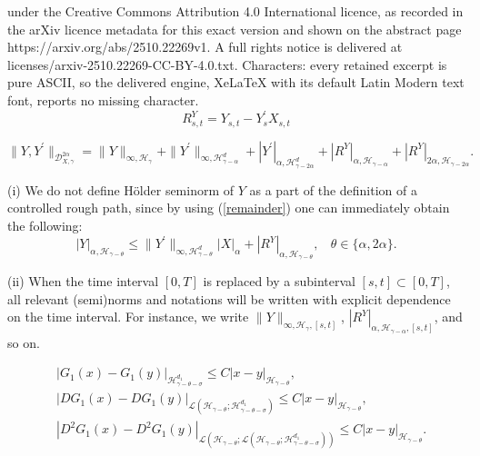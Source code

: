 \documentclass[10pt,a4paper]{amsart}
\begin{document}
under the Creative Commons Attribution 4.0 International licence, as recorded in the arXiv licence metadata for this exact version and shown on the abstract page https://arxiv.org/abs/2510.22269v1. A full rights notice is delivered at licenses/arxiv-2510.22269-CC-BY-4.0.txt. Characters: every retained excerpt is pure ASCII, so the delivered engine, XeLaTeX with its default Latin Modern text font, reports no missing character.
	\begin{equation}\label{remainder}
		R_{s,t}^Y = Y_{s,t}-Y_s^{\prime}  X_{s,t}
	\end{equation}

\begin{equation}\label{norm}
	\|Y,Y^{\prime}\|_{ \mathcal{D}_{X,\gamma}^{2\alpha} }=
	\|Y\|_{\infty, \mathcal H_\gamma}
	+ \|Y^{\prime}\|_{\infty, \mathcal H_{\gamma-\alpha}^d}
	+|Y^{\prime}|_{\alpha, \mathcal H_{\gamma-2\alpha}^d}
	+|R^Y|_{\alpha, \mathcal H_{\gamma-\alpha}}
	+|R^Y|_{2\alpha,\mathcal H_{\gamma-2\alpha}} .
\end{equation}

\begin{remark}
(i) We do not define H\"{o}lder seminorm of $Y$ as a part of the definition of a controlled rough path,
since by using (\ref{remainder}) one can immediately obtain the following:
\begin{equation}\label{Y}
|Y|_{ \alpha , \mathcal H_{\gamma-\theta} } \leq \| Y^{\prime} \|_{\infty, \mathcal H_{\gamma-\theta}^d } |X|_{\alpha} + |R^Y|_{\alpha, \mathcal H_{\gamma-\theta} }, ~~~~ \theta \in \{\alpha,2\alpha\}.
\end{equation}

(ii) When the time interval $[0, T]$ is replaced by a subinterval $[s, t]\subset [0,T]$, all relevant (semi)norms and notations will be written with explicit dependence on the time interval. For instance, we write $\|Y\|_{\infty, \mathcal H_\gamma,[s,t]}$, $|R^Y|_{\alpha,\mathcal H_{\gamma-\alpha},[s,t]}$, and so on.
\end{remark}	

\begin{align}
	&|G_1(x)-G_1(y)|_{\mathcal{H}_{\gamma-\theta-\sigma}^{d_1}} \leq C |x-y|_{\mathcal H_{\gamma-\theta}}, \label{G1} \\
	&  |DG_1(x)-DG_1(y)|_{\mathcal L(\mathcal H_{\gamma-\theta}; \mathcal{H}_{\gamma-\theta-\sigma}^{d_1})}
		\leq C |x-y|_{\mathcal H_{\gamma-\theta}},   \label{DG1}    \\
	&  |D^2G_1(x)-D^2G_1(y)|_{\mathcal L (\mathcal H_{\gamma-\theta}; \mathcal L(\mathcal H_{\gamma-\theta}; \mathcal{H}_{\gamma-\theta-\sigma}^{d_1})) }
		\leq C |x-y|_{\mathcal H_{\gamma-\theta}}.   \label{D2G1}
	\end{align}	
\end{document}
